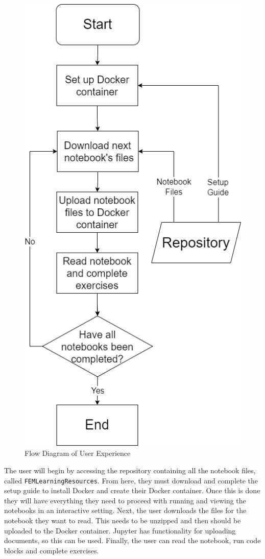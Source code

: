 \begin{figure}[h]
\centering
\includegraphics[scale=0.25]{./images/misc/user_experience.drawio}
\caption{Flow Diagram of User Experience} \label{fig:user-experience}
\end{figure}

The user will begin by accessing the repository containing all the notebook files, called \texttt{FEMLearningResources}. From here, they must download and complete the setup guide to install Docker and create their Docker container. Once this is done they will have everything they need to proceed with running and viewing the notebooks in an interactive setting. Next, the user downloads the files for the notebook they want to read. This needs to be unzipped and then should be uploaded to the Docker container. Jupyter has functionality for uploading documents, so this can be used. Finally, the user can read the notebook, run code blocks and complete exercises.

